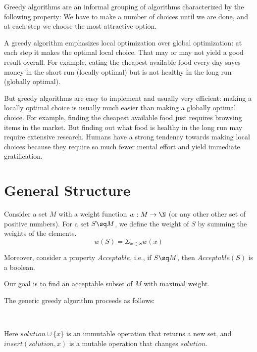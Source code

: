 Greedy algorithms are an informal grouping of algorithms characterized by the following property: We have to make a number of choices until we are done, and at each step we choose the most attractive option.

A greedy algorithm emphasizes local optimization over global optimization: at each step it makes the optimal local choice.
That may or may not yield a good result overall.
For example, eating the cheapest available food every day saves money in the short run (locally optimal) but is not healthy in the long run (globally optimal).

But greedy algorithms are easy to implement and usually very efficient: making a locally optimal choice is usually much easier than making a globally optimal choice.
For example, finding the cheapest available food just requires browsing items in the market.
But finding out what food is healthy in the long run may require extensive research.
Humans have a strong tendency towards making local choices because they require so much fewer mental effort and yield immediate gratification.

\section{General Structure}

Consider a set $M$ with a weight function $w:M\to \N$ (or any other other set of positive numbers).
For a set $S\sq M$, we define the weight of $S$ by summing the weights of the elements.
 \[w(S)=\Sigma_{x\in S} w(x)\]

Moreover, consider a property $Acceptable$, i.e., if $S\sq M$, then $Acceptable(S)$ is a boolean.

Our goal is to find an acceptable subset of $M$ with maximal weight.

The generic greedy algorithm proceeds as follows:
\begin{acode}
\\
\end{acode}
Here $solution \cup \{x\}$ is an immutable operation that returns a new set, and $insert(solution,x)$ is a mutable operation that changes $solution$.

